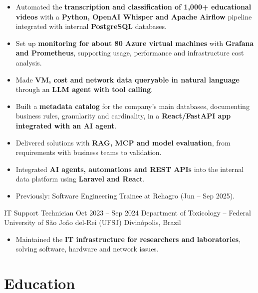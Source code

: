 \documentclass[10pt,a4paper]{article}
\begin{document}
\begin{itemize}

    \item Automated the \textbf{transcription and classification of 1,000+ educational videos}
    with a \textbf{Python, OpenAI Whisper and Apache Airflow} pipeline integrated with internal
    \textbf{PostgreSQL} databases.

    \item Set up \textbf{monitoring for about 80 Azure virtual machines} with \textbf{Grafana and
    Prometheus}, supporting usage, performance and infrastructure cost analysis.

    \item Made \textbf{VM, cost and network data queryable in natural language} through an \textbf{LLM agent with tool calling}.

    \item Built a \textbf{metadata catalog} for the company's main databases, documenting business
    rules, granularity and cardinality, in a \textbf{React/FastAPI app integrated with an AI agent}.

    \item Delivered solutions with \textbf{RAG, MCP and model evaluation}, from requirements with business teams to validation.

    \item Integrated \textbf{AI agents, automations and REST APIs} into the internal data platform using \textbf{Laravel and React}.

    \item Previously: Software Engineering Trainee at Rehagro (Jun -- Sep 2025).

\end{itemize}

\entry
{IT Support Technician}
{Oct 2023 -- Sep 2024}
{Department of Toxicology -- Federal University of São João del-Rei (UFSJ)}
{Divinópolis, Brazil}

\begin{itemize}

    \item Maintained the \textbf{IT infrastructure for researchers and laboratories}, solving software, hardware and network issues.

\end{itemize}

\section*{Education}
\end{document}
